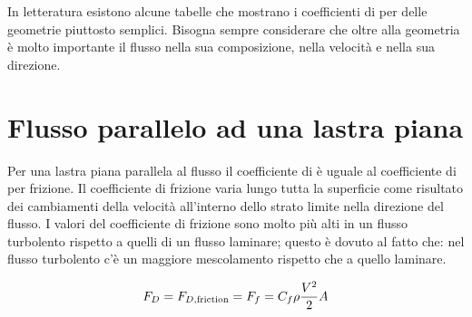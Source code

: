 In letteratura esistono alcune tabelle che mostrano i coefficienti di  per delle geometrie piuttosto semplici.
Bisogna sempre considerare che oltre alla geometria è molto importante il flusso nella sua composizione, nella velocità e nella sua direzione.

\section{Flusso parallelo ad una lastra piana}
Per una lastra piana parallela al flusso il coefficiente di  è uguale al coefficiente di  per frizione.
Il coefficiente di frizione varia lungo tutta la superficie come risultato dei cambiamenti della velocità all'interno dello strato limite nella direzione del flusso.
I valori del coefficiente di frizione sono molto più alti in un flusso turbolento rispetto a quelli di un flusso laminare; questo è dovuto al fatto che: nel flusso turbolento c'è un maggiore mescolamento rispetto che a quello laminare.

\begin{equation}
F_D = F_{D,\textup{friction}} = F_f = C_f \rho \frac{V^2}{2}A
\label{eqn:DragFriction}
\end{equation}

\begin{figure}
\centering
{} \quad
{}
\end{figure}

